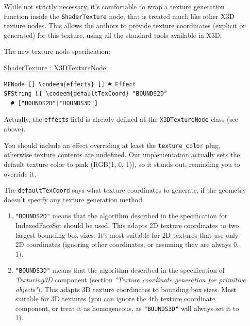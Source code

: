 \documentclass{acmsiggraph}                     %
\newenvironment{mycode}
{\begin{mycodecore}}
{\end{mycodecore}
\vspace{-0.1in}}
\newcommand*{\codeem}[1]{\textbf{#1}}
\newenvironment{myenumerate}
{\begin{enumerate}
  \setlength{\itemsep}{0pt}
  \setlength{\parskip}{0pt}
  \setlength{\parsep}{0pt}}
{\end{enumerate}}
\begin{document}
While not strictly necessary, it's comfortable to wrap a texture generation
function inside the \texttt{ShaderTexture} node, that is treated much
like other X3D texture nodes. This allows the authors to provide texture
coordinates (explicit or generated) for this texture, using all the standard
tools available in X3D.

The new texture node specification:

\begin{mycode}
\underline{ShaderTexture : X3DTextureNode}
\begin{Verbatim}[commandchars=\\\{\}]
MFNode [] \codeem{effects} [] # Effect
SFString [] \codeem{defaultTexCoord} "BOUNDS2D"
  # ["BOUNDS2D"|"BOUNDS3D"]
\end{Verbatim}
\end{mycode}

Actually, the \texttt{effects} field is already defined at
the \texttt{X3DTextureNode} class (see above).

You should include an effect overriding at least the \texttt{texture\_color}
plug, otherwise texture contents are undefined. Our implementation actually
sets the default texture color to pink (RGB(1, 0, 1)), so it stands out,
reminding you to override it.

The \texttt{defaultTexCoord} says what texture coordinates to generate,
if the geometry doesn't specify any texture generation method.

\begin{myenumerate}

\item
  \texttt{"BOUNDS2D"} means that the algorithm described in the specification
  for {IndexedFaceSet} should be used. This adapts 2D texture coordinates
  to two largest bounding box sizes.
  It's most suitable for 2D textures that use only 2D coordinates
  (ignoring other coordinates, or assuming they are always 0, 1).

\item
  \texttt{"BOUNDS3D"} means that the algorithm described in the specification
  of \textit{Texturing3D} component (section \textit{"Texture coordinate generation for primitive objects"}).
  This adapts 3D texture coordinates to bounding box sizes.
  Most suitable for 3D textures (you can ignore the 4th texture coordinate
  component, or treat it as homogeneous, as \texttt{"BOUNDS3D"} will always
  set it to 1).

\end{myenumerate}
\end{document}
